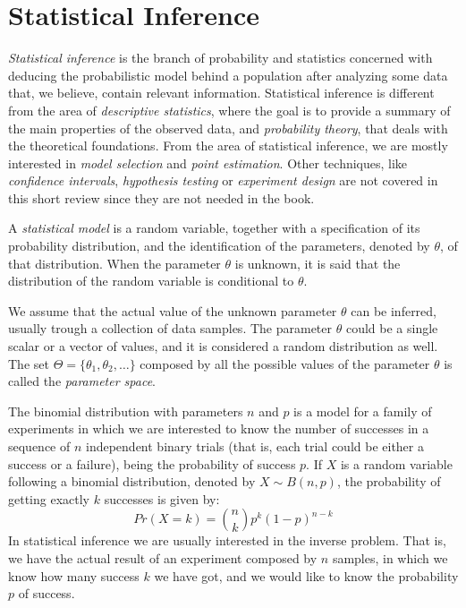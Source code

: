 %
%

\section{Statistical Inference}

\emph{Statistical inference} is the branch of probability and statistics concerned with deducing the probabilistic model behind a population after analyzing some data that, we believe, contain relevant information. Statistical inference is different from the area of \emph{descriptive statistics}, where the goal is to provide a summary of the main properties of the observed data, and \emph{probability theory}, that deals with the theoretical foundations. From the area of statistical inference, we are mostly interested in \emph{model selection} and \emph{point estimation}. Other techniques, like \emph{confidence intervals}, \emph{hypothesis testing} or \emph{experiment design} are not covered in this short review since they are not needed in the book.

\begin{definition}
    A \emph{statistical model} is a random variable, together with a specification of its probability distribution, and the identification of the parameters, denoted by $\theta$, of that distribution. When the parameter $\theta$ is unknown, it is said that the distribution of the random variable is conditional to $\theta$.
\end{definition}

We assume that the actual value of the unknown parameter $\theta$ can be inferred, usually trough a collection of data samples. The parameter $\theta$ could be a single scalar or a vector of values, and it is considered a random distribution as well. The set $\Theta = \{ \theta_1, \theta_2, \ldots \}$ composed by all the possible values of the parameter $\theta$ is called the \emph{parameter space}.

\begin{example}
\label{ex:binomial}
The binomial distribution with parameters $n$ and $p$ is a model for a family of experiments in which we are interested to know the number of successes in a sequence of $n$ independent binary trials (that is, each trial could be either a success or a failure), being the probability of success $p$. If $X$ is a random variable following a binomial distribution, denoted by $X \sim B(n,p)$, the probability of getting exactly $k$ successes is given by:
\[
    Pr(X=k) = {\binom {n}{k}}p^{k}(1-p)^{n-k}
\]
In statistical inference we are usually interested in the inverse problem. That is, we have the actual result of an experiment composed by $n$ samples, in which we know how many success $k$ we have got, and we would like to know the probability $p$ of success.
\end {example}

